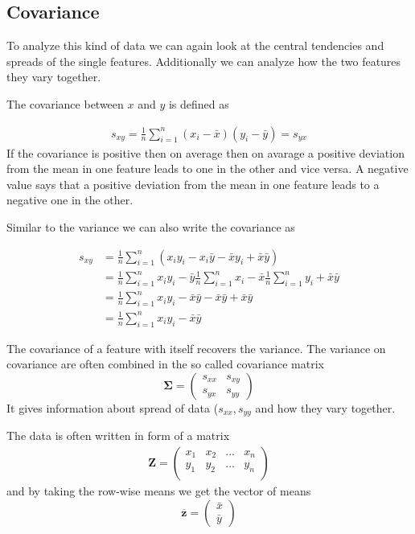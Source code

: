 \subsection {Covariance}
To analyze this kind of data we can again look at the central tendencies and 
spreads of the single features.
Additionally we can analyze how the two features they vary together.

The covariance between $x$ and $y$ is defined as

\begin{align}
s_{xy}=\frac{1}{n}\sum_{i=1}^{n}(x_{i}-\bar{x})(y_{i}-\bar{y}) = s_{yx}
\end{align}
If the covariance is positive then on average then on avarage a 
positive deviation from the mean in one feature leads to one in the other and vice versa.
A negative value says that a positive deviation from the mean in one feature leads to a negative one in the other.

Similar to the variance we can also write the covariance as 
    
\begin{align}
    s_{xy} &= \frac{1}{n} \sum_{i=1}^{n} (x_{i}y_{i}-x_{i}\bar{y}-\bar{x}y_{i}+\bar{x}\bar{y}) \\
           &= \frac{1}{n} \sum_{i=1}^{n} x_{i}y_{i}-\bar{y}\frac{1}{n}\sum_{i=1}^{n}x_{i}-\bar{x}\frac{1}{n}\sum_{i=1}^{n}y_{i}+\bar{x}\bar{y} \\
           &= \frac{1}{n} \sum_{i=1}^{n} x_{i}y_{i}-\bar{x}\bar{y}-\bar{x}\bar{y}+\bar{x}\bar{y}\\
           &= \frac{1}{n} \sum_{i=1}^{n} x_{i}y_{i}-\bar{x}\bar{y}
\end{align}



The covariance of a feature with itself recovers the variance.
The variance on covariance are often combined in the so called covariance matrix
\begin{equation*}
\bm{\Sigma} = 
\begin{pmatrix}
s_{xx} & s_{xy} \\
s_{yx} & s_{yy} 
\end{pmatrix}
\end{equation*}
It gives information about spread of data ($s_{xx},s_{yy}$ and how they vary together.

\newcommand*\mean[1]{\overline{#1}}

The data is often written in form of a matrix 
\begin{align}
\bm{Z} = 
\begin{pmatrix}
x_{1} & x_{2} & \hdots & x_n \\
y_{1} & y_{2} & \hdots & y_{n} \\
\end{pmatrix} 
\end{align}
and by taking the row-wise means we get the vector of means
\begin{equation*}
\mean{\bm{z}} = 
\begin{pmatrix}
\bar{x} \\
\bar{y} 
\end{pmatrix}
\end{equation*}

